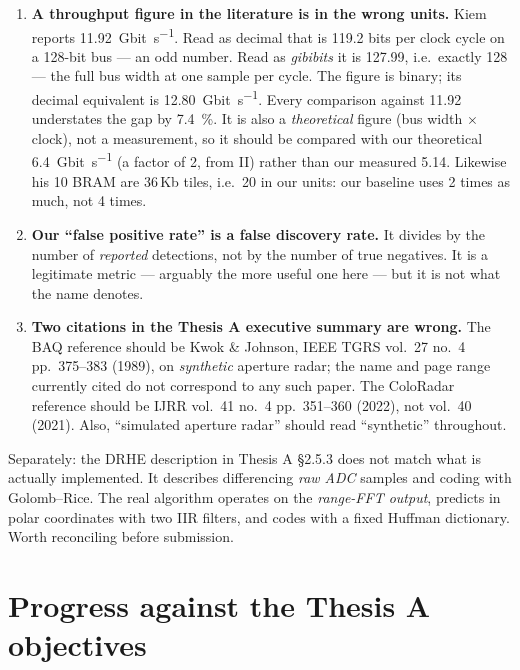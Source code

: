\documentclass[11pt,a4paper]{article}
\begin{document}
\begin{enumerate}
\item \textbf{A throughput figure in the literature is in the wrong units.}
Kiem reports \SI{11.92}{Gbit\per\second}. Read as decimal that is \num{119.2}
bits per clock cycle on a 128-bit bus --- an odd number. Read as
\emph{gibibits} it is \num{127.99}, i.e.\ exactly \num{128} --- the full bus
width at one sample per cycle. The figure is binary; its decimal equivalent is
\SI{12.80}{Gbit\per\second}. Every comparison against \num{11.92} understates
the gap by \SI{7.4}{\percent}. It is also a \emph{theoretical} figure (bus
width $\times$ clock), not a measurement, so it should be compared with our
theoretical \SI{6.4}{Gbit\per\second} (a factor of 2, from II) rather than our
measured \SI{5.14}{}. Likewise his 10 BRAM are 36\,Kb tiles, i.e.\ 20 in our
units: our baseline uses 2 times as much, not 4 times.

\item \textbf{Our ``false positive rate'' is a false discovery rate.} It
divides by the number of \emph{reported} detections, not by the number of true
negatives. It is a legitimate metric --- arguably the more useful one here ---
but it is not what the name denotes.

\item \textbf{Two citations in the Thesis A executive summary are wrong.} The
BAQ reference should be Kwok \& Johnson, IEEE TGRS vol.~27 no.~4 pp.~375--383
(1989), on \emph{synthetic} aperture radar; the name and page range currently
cited do not correspond to any such paper. The ColoRadar reference should be
IJRR vol.~41 no.~4 pp.~351--360 (2022), not vol.~40 (2021). Also, ``simulated
aperture radar'' should read ``synthetic'' throughout.
\end{enumerate}

\noindent
Separately: the DRHE description in Thesis A \S2.5.3 does not match what is
actually implemented. It describes differencing \emph{raw ADC} samples and
coding with Golomb--Rice. The real algorithm operates on the \emph{range-FFT
output}, predicts in polar coordinates with two IIR filters, and codes with a
fixed Huffman dictionary. Worth reconciling before submission.

\section{Progress against the Thesis A objectives}
\end{document}
